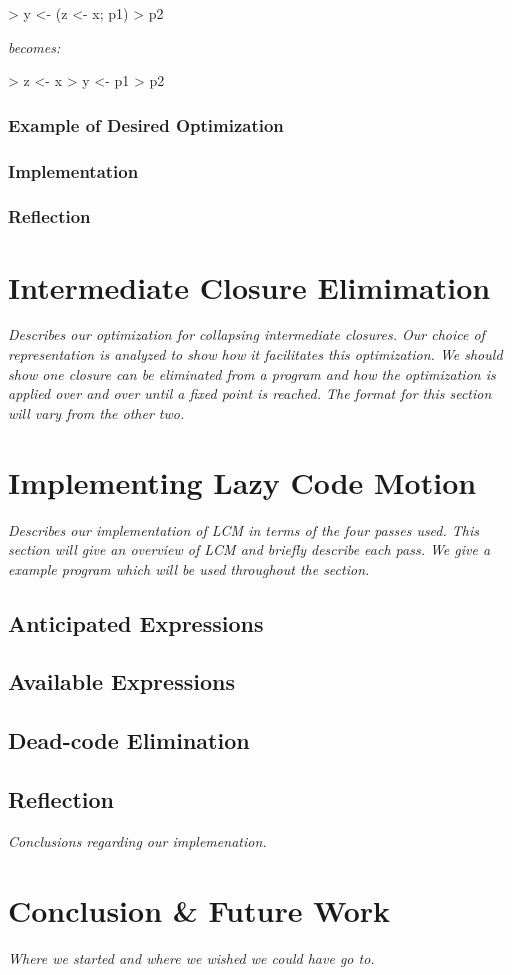 \documentclass[12pt]{report}
\begin{document}
> y <- (z <- x; p1)
> p2

\noindent
\emph{becomes:}

> z <- x
> y <- p1
> p2

\subsection{Example of Desired Optimization}
\subsection{Implementation}
\subsection{Reflection}

\chapter{Intermediate Closure Elimimation}
\emph{Describes our optimization for collapsing intermediate
closures. Our choice of representation is analyzed to
show how it facilitates this optimization. We should show one
closure can be eliminated from a program and how the optimization
is applied over and over until a fixed point is reached. The format
for this section will vary from the other two.}

\chapter{Implementing Lazy Code Motion}
\emph{Describes our implementation of LCM in terms of the four passes
  used. This section will give an overview of LCM and briefly describe
  each pass. We give a example program which will be used throughout
  the section.}

\section{Anticipated Expressions}

\section{Available Expressions}

\section{Dead-code Elimination}

\section{Reflection}

\emph{Conclusions regarding our implemenation.}

\chapter{Conclusion \& Future Work}

\emph{Where we started and where we wished we could have go to.}
\end{document}

